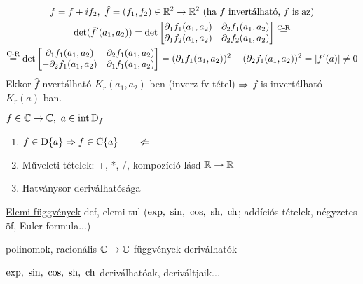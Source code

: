 \begin{biz}
\begin{gather*}
  f=f+if_2,\ \hat f = (f_1,f_2) \in \mathbb{R}^2\to\mathbb{R}^2\text{ (ha $f$ invertálható, $f$ is az)}\\
  \det (\hat{f}'(a_1,a_2)) = \det \begin{bmatrix}\partial_1f_1(a_1,a_2) & \partial_2f_1(a_1,a_2) \\
    \partial_1f_2(a_1,a_2) & \partial_2f_2(a_1,a_2)\end{bmatrix} \overset{\text{C-R}}{=}\\\overset{\text{C-R}}{=}
  \det\begin{bmatrix} \partial_1f_1(a_1,a_2) & \partial_2f_1(a_1,a_2) \\  -\partial_2f_1(a_1,a_2) &
  \partial_1f_1(a_1,a_2)\end{bmatrix} = (\partial_1f_1(a_1,a_2))^2 - (\partial_2f_1(a_1,a_2))^2 = \vert f'(a)\vert\neq 0  
\end{gather*}
Ekkor $\hat f$ nvertálható $K_r(a_1,a_2)$-ben  (inverz fv tétel) $\Rightarrow$ $f$ is invertálható $K_r(a)$-ban.
\end{biz}

\begin{te} $f\in\mathbb{C}\to\mathbb{C},\ a\in\operatorname{int\,D}_f$
  \begin{enumerate}
    \item $f\in \operatorname{D}\{a\} \Rightarrow f\in \operatorname{C}\{a\}\qquad \not\Leftarrow$
    \item Műveleti tételek: +, *, /, kompozíció lásd $\mathbb{R}\to\mathbb{R}$
    \item Hatványsor deriválhatósága      
  \end{enumerate}
\end{te}

\noindent \underline{Elemi függvények} def, elemi tul ($\exp,\ \sin,\ \cos,\ \operatorname{sh},\ \operatorname{ch}$; addíciós tételek, négyzetes öf,
Euler-formula...)

\begin{kov}\begin{korlista}
  \item polinomok, racionális $\mathbb{C}\to\mathbb{C}$ függvények deriválhatók
  \item $\exp,\ \sin,\ \cos,\ \operatorname{sh},\ \operatorname{ch}$ deriválhatóak, deriváltjaik...
    \end{korlista}
\end{kov}

